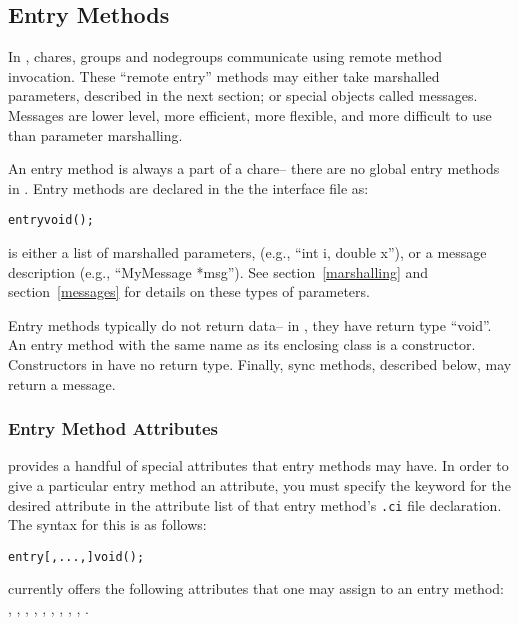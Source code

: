 \subsection{Entry Methods}

\label{entry}

In \charmpp, chares, groups and 
nodegroups communicate using remote method invocation.  These ``remote entry'' methods may either take marshalled parameters, described in the next section; or special objects called messages.  Messages are lower level, more efficient, more flexible, and more difficult to use than parameter marshalling.

An entry method is always a part of a chare--
there are no global entry methods in \charmpp{}.
Entry methods are declared in the the interface file as:

\begin{alltt}
entry void ();
\end{alltt}

 is either a list of marshalled parameters,
(e.g., ``int i, double x''), or a message description (e.g.,
``MyMessage *msg'').  See section~\ref{marshalling} and
section~\ref{messages} for details on these types of
parameters.

Entry methods typically do not return data-- in \CC, they have
return type ``void''.  An entry method with the same name
as its enclosing class is a constructor.  Constructors in \CC
have no return type.  Finally, sync methods, described below,
may return a message.

\subsubsection{Entry Method Attributes}

\label{attributes}

\charmpp{}  provides a handful of special attributes that entry methods may have.  In order to give a particular entry method an attribute, you must specify the keyword for the desired
attribute in the attribute list of that entry method's {\tt .ci} file
declaration.  The syntax for this is as follows:

\begin{alltt}
entry [, ..., ] void ();
\end{alltt}

\charmpp{} currently offers the following attributes that one may assign to 
an entry method:
, , , , , , , , , .

